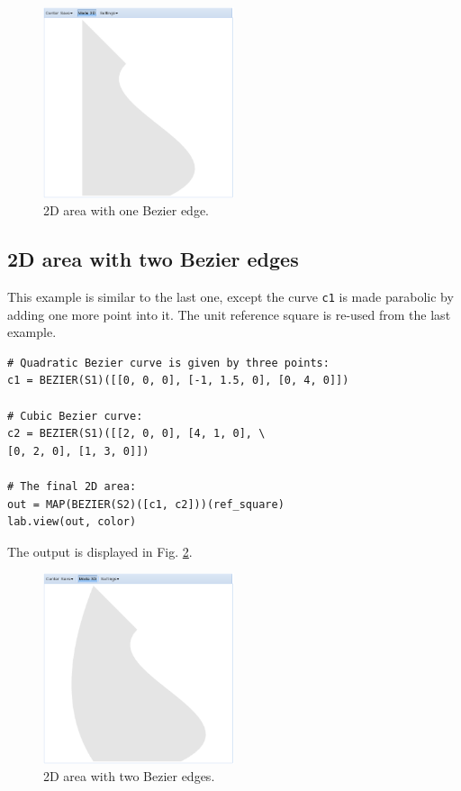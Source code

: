 \documentclass{article}
\begin{document}
\begin{figure}[!ht]
\begin{center}
\includegraphics[width=0.5\textwidth]{img/curves-1.png}
\end{center}
\vspace{-2mm}
\caption{2D area with one Bezier edge.}
\label{fig:curves-1}
\end{figure}


\subsection{2D area with two Bezier edges}

This example is similar to the last one, except the curve {\tt c1} is 
made parabolic by adding one more point into it. The unit reference square 
is re-used from the last example.

\begin{verbatim}
# Quadratic Bezier curve is given by three points:
c1 = BEZIER(S1)([[0, 0, 0], [-1, 1.5, 0], [0, 4, 0]])

# Cubic Bezier curve:
c2 = BEZIER(S1)([[2, 0, 0], [4, 1, 0], \
[0, 2, 0], [1, 3, 0]])

# The final 2D area:
out = MAP(BEZIER(S2)([c1, c2]))(ref_square)
lab.view(out, color)
\end{verbatim}
The output is displayed in Fig. \ref{fig:curves-2}.

\begin{figure}[!ht]
\begin{center}
\includegraphics[width=0.5\textwidth]{img/curves-2.png}
\end{center}
\vspace{-2mm}
\caption{2D area with two Bezier edges.}
\label{fig:curves-2}
\end{figure}
\end{document}
